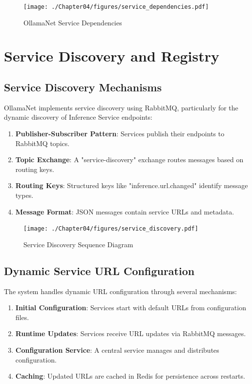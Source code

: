 \begin{figure}
    \centering
    \texttt{[image: ./Chapter04/figures/service\_dependencies.pdf]}
    \caption{OllamaNet Service Dependencies}
    \label{fig:service-dependencies}
\end{figure}
\clearpage

\section{Service Discovery and Registry}

\subsection{Service Discovery Mechanisms}

OllamaNet implements service discovery using RabbitMQ, particularly for the dynamic discovery of Inference Service endpoints:

\begin{enumerate}
   \item \textbf{Publisher-Subscriber Pattern}: Services publish their endpoints to RabbitMQ topics.
   \item \textbf{Topic Exchange}: A "service-discovery" exchange routes messages based on routing keys.
   \item \textbf{Routing Keys}: Structured keys like "inference.url.changed" identify message types.
   \item \textbf{Message Format}: JSON messages contain service URLs and metadata.
\end{enumerate}

\begin{figure}
    \centering
    \texttt{[image: ./Chapter04/figures/service\_discovery.pdf]}
    \caption{Service Discovery Sequence Diagram}
    \label{fig:service-discovery}
\end{figure}
\clearpage

\subsection{Dynamic Service URL Configuration}

The system handles dynamic URL configuration through several mechanisms:

\begin{enumerate}
   \item \textbf{Initial Configuration}: Services start with default URLs from configuration files.
   \item \textbf{Runtime Updates}: Services receive URL updates via RabbitMQ messages.
   \item \textbf{Configuration Service}: A central service manages and distributes configuration.
   \item \textbf{Caching}: Updated URLs are cached in Redis for persistence across restarts.
\end{enumerate}

